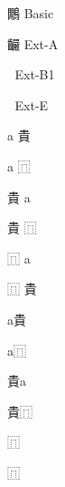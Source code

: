 \documentclass{minimal}
\begin{document}
鷳 Basic\par
䶫 Ext-A\par
𠀂 Ext-B1\par
𫢔 Ext-E\par

a 貴\par
a ⿵\par
貴 a\par
貴 ⿵\par
⿵ a\par
⿵ 貴\par

a貴\par
a⿵\par
貴a\par
貴⿵\par
⿵ \par
⿵ \par
\end{document}
